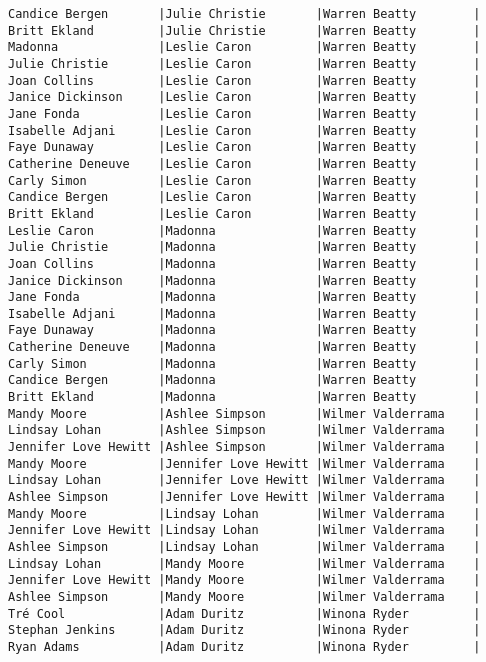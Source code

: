 \documentclass{article}
\begin{document}
\begin{verbatim}
Candice Bergen       |Julie Christie       |Warren Beatty        |
Britt Ekland         |Julie Christie       |Warren Beatty        |
Madonna              |Leslie Caron         |Warren Beatty        |
Julie Christie       |Leslie Caron         |Warren Beatty        |
Joan Collins         |Leslie Caron         |Warren Beatty        |
Janice Dickinson     |Leslie Caron         |Warren Beatty        |
Jane Fonda           |Leslie Caron         |Warren Beatty        |
Isabelle Adjani      |Leslie Caron         |Warren Beatty        |
Faye Dunaway         |Leslie Caron         |Warren Beatty        |
Catherine Deneuve    |Leslie Caron         |Warren Beatty        |
Carly Simon          |Leslie Caron         |Warren Beatty        |
Candice Bergen       |Leslie Caron         |Warren Beatty        |
Britt Ekland         |Leslie Caron         |Warren Beatty        |
Leslie Caron         |Madonna              |Warren Beatty        |
Julie Christie       |Madonna              |Warren Beatty        |
Joan Collins         |Madonna              |Warren Beatty        |
Janice Dickinson     |Madonna              |Warren Beatty        |
Jane Fonda           |Madonna              |Warren Beatty        |
Isabelle Adjani      |Madonna              |Warren Beatty        |
Faye Dunaway         |Madonna              |Warren Beatty        |
Catherine Deneuve    |Madonna              |Warren Beatty        |
Carly Simon          |Madonna              |Warren Beatty        |
Candice Bergen       |Madonna              |Warren Beatty        |
Britt Ekland         |Madonna              |Warren Beatty        |
Mandy Moore          |Ashlee Simpson       |Wilmer Valderrama    |
Lindsay Lohan        |Ashlee Simpson       |Wilmer Valderrama    |
Jennifer Love Hewitt |Ashlee Simpson       |Wilmer Valderrama    |
Mandy Moore          |Jennifer Love Hewitt |Wilmer Valderrama    |
Lindsay Lohan        |Jennifer Love Hewitt |Wilmer Valderrama    |
Ashlee Simpson       |Jennifer Love Hewitt |Wilmer Valderrama    |
Mandy Moore          |Lindsay Lohan        |Wilmer Valderrama    |
Jennifer Love Hewitt |Lindsay Lohan        |Wilmer Valderrama    |
Ashlee Simpson       |Lindsay Lohan        |Wilmer Valderrama    |
Lindsay Lohan        |Mandy Moore          |Wilmer Valderrama    |
Jennifer Love Hewitt |Mandy Moore          |Wilmer Valderrama    |
Ashlee Simpson       |Mandy Moore          |Wilmer Valderrama    |
Tré Cool             |Adam Duritz          |Winona Ryder         |
Stephan Jenkins      |Adam Duritz          |Winona Ryder         |
Ryan Adams           |Adam Duritz          |Winona Ryder         |

\end{verbatim}
\end{document}

